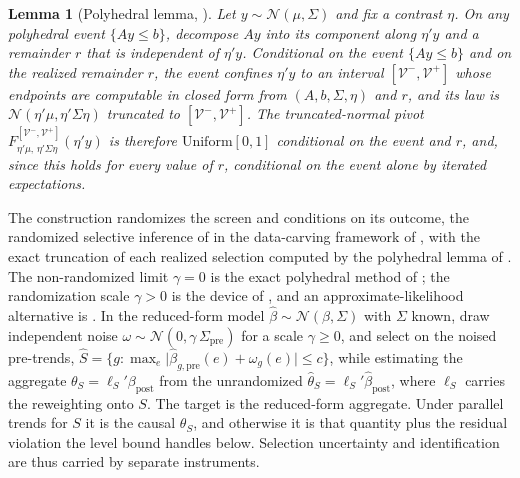 \documentclass[12pt]{article}
\newtheorem{lemma}{Lemma}
\theoremstyle{remark}
\begin{document}
\begin{lemma}[Polyhedral lemma, \citealp{lee2016}]\label{lem:poly}
Let $y\sim\mathcal N(\mu,\Sigma)$ and fix a contrast $\eta$. On any polyhedral event $\{Ay\le b\}$,
decompose $Ay$ into its component along $\eta'y$ and a remainder $r$ that is independent of $\eta'y$.
Conditional on the event $\{Ay\le b\}$ and on the realized remainder $r$, the event confines $\eta'y$ to an
interval $[\mathcal V^-,\mathcal V^+]$ whose endpoints are computable in closed form from $(A,b,\Sigma,\eta)$
and $r$, and its law is $\mathcal N(\eta'\mu,\eta'\Sigma\eta)$ truncated to $[\mathcal V^-,\mathcal V^+]$. The
truncated-normal pivot $F^{[\mathcal V^-,\mathcal V^+]}_{\eta'\mu,\,\eta'\Sigma\eta}(\eta'y)$ is therefore
$\mathrm{Uniform}[0,1]$ conditional on the event and $r$, and, since this holds for every value of $r$,
conditional on the event alone by iterated expectations.
\end{lemma}

The construction randomizes the screen and conditions on its outcome, the randomized selective inference of
\citet{tiantaylor2018} in the data-carving framework of \citet{fithian2014}, with the exact truncation of
each realized selection computed by the polyhedral lemma of \citet{lee2016}. The non-randomized limit
$\gamma=0$ is the exact polyhedral method of \citet{lee2016}; the randomization scale $\gamma>0$ is the
device of \citet{tiantaylor2018}, and an approximate-likelihood alternative is \citet{panigrahi2023}. In
the reduced-form model
$\hat\beta\sim\mathcal N(\beta,\Sigma)$ with $\Sigma$ known, draw independent noise
$\omega\sim\mathcal N(0,\gamma\,\Sigma_{\mathrm{pre}})$ for a scale $\gamma\ge0$, and select on the noised
pre-trends, $\hat S=\{g:\max_e\lvert\hat\beta_{g,\mathrm{pre}}(e)+\omega_{g}(e)\rvert\le c\}$, while
estimating the aggregate $\theta_S=\ell_S'\beta_{\mathrm{post}}$ from the unrandomized
$\hat\theta_S=\ell_S'\hat\beta_{\mathrm{post}}$, where $\ell_S$ carries the reweighting onto $S$. The
target is the reduced-form aggregate. Under parallel trends for $S$ it is the causal $\theta_S$, and
otherwise it is that quantity plus the residual violation the level bound handles below. Selection
uncertainty and identification are thus carried by separate instruments.
\end{document}
